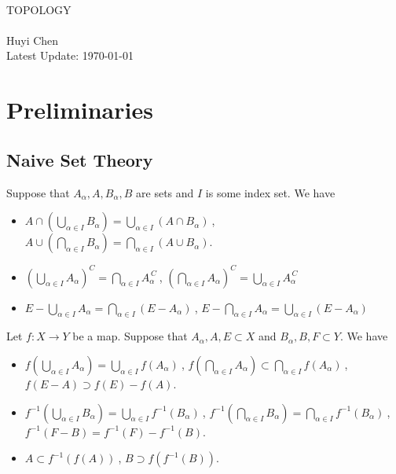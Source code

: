 \documentclass{report}
\theoremstyle{nonumberplain}
\begin{document}
	\begin{center}	
	~\\ 
	\vspace{6em} 
	\textsc{\Huge TOPOLOGY}	
	~\\
	\vspace{2.5em} 
	{\Large }
	~\\
	\vspace{6em}
	\textsf{Huyi Chen}
	~\\
	\vspace{5in}  
	{\large Latest Update: \today}
	\end{center}

\chapter{Preliminaries}

\section{Naive Set Theory}
	Suppose that $A_\alpha,A,B_\alpha,B$ are sets and $I$ is some index set. We have
\begin{itemize}	
	\item $A\cap\left(\bigcup\limits_{\alpha\in I}B_\alpha\right)=\bigcup\limits_{\alpha\in I}\left(A\cap B_\alpha\right)\ $, $A\cup\left(\bigcap\limits_{\alpha\in I}B_\alpha\right)=\bigcap\limits_{\alpha\in I}\left(A\cup B_\alpha\right)$.
	\item $\left(\bigcup\limits_{\alpha\in I}A_\alpha\right)^C=\bigcap\limits_{\alpha\in I}A_\alpha^{\,C}\ $, $\left(\bigcap\limits_{\alpha\in I}A_\alpha\right)^C=\bigcup\limits_{\alpha\in I}A_\alpha^{\,C}$ 
	\item $E-\bigcup\limits_{\alpha\in I}A_\alpha=\bigcap\limits_{\alpha\in I}\left(E-A_\alpha\right)\ $, $E-\bigcap\limits_{\alpha\in I}A_\alpha=\bigcup\limits_{\alpha\in I}\left(E-A_\alpha\right)\ $ 
\end{itemize} 
Let $f:X\to Y$ be a map. Suppose that $A_\alpha,A,E\subset X$ and $B_\alpha,B,F\subset Y$. We have
\begin{itemize}	
	\item $f\left(\bigcup\limits_{\alpha\in I}A_\alpha\right)=\bigcup\limits_{\alpha\in I}f\left(A_\alpha\right)\ $, $f\left(\bigcap\limits_{\alpha\in I}A_\alpha\right)\subset\bigcap\limits_{\alpha\in I}f\left(A_\alpha\right)\ $, $f(E-A)\supset f(E)-f(A)$.	
	\item $f^{-1}\left(\bigcup\limits_{\alpha\in I}B_\alpha\right)=\bigcup\limits_{\alpha\in I}f^{-1}\left(B_\alpha\right)\ $, $f^{-1}\left(\bigcap\limits_{\alpha\in I}B_\alpha\right)=\bigcap\limits_{\alpha\in I}f^{-1}\left(B_\alpha\right)\ $, $f^{-1}(F-B)=f^{-1}(F)-f^{-1}(B)$.
	\item $A\subset f^{-1}(f(A))\ $, $B\supset f(f^{-1}(B))$.
\end{itemize}
\end{document}
